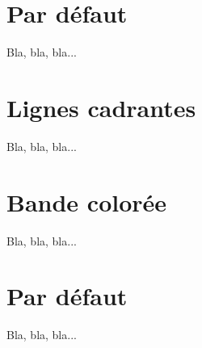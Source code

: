 \documentclass{../main/main}
\begin{document}
\section{Par défaut}

\begin{tdocshowcase}
  Bla, bla, bla...
\end{tdocshowcase}


\section{Lignes cadrantes}

\begin{tdocshowcase}[style = rule]
  Bla, bla, bla...
\end{tdocshowcase}


\section{Bande colorée}

\begin{tdocshowcase}[style = stripe]
  Bla, bla, bla...
\end{tdocshowcase}


\section{Par défaut}

\begin{tdocshowcase}
  Bla, bla, bla...
\end{tdocshowcase}
\end{document}
